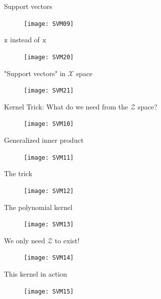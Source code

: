 \begin{frame}{Support vectors}
\begin{figure}
\texttt{[image: SVM09]}
\end{figure}
\end{frame}

\begin{frame}{${\rm z}$ instead of ${\rm x}$}
\begin{figure}
\texttt{[image: SVM20]}
\end{figure}
\end{frame}

\begin{frame}{"Support vectors" in $\mathcal{X}$ space}
\begin{figure}
\texttt{[image: SVM21]}
\end{figure}
\end{frame}

\begin{frame}{Kernel Trick: What do we need from the $\mathcal{Z}$ space?}
\begin{figure}
\texttt{[image: SVM10]}
\end{figure}
\end{frame}

\begin{frame}{Generalized inner product}
\begin{figure}
\texttt{[image: SVM11]}
\end{figure}
\end{frame}

\begin{frame}{The trick}
\begin{figure}
\texttt{[image: SVM12]}
\end{figure}
\end{frame}

\begin{frame}{The polynomial kernel}
\begin{figure}
\texttt{[image: SVM13]}
\end{figure}
\end{frame}

\begin{frame}{We only need $\mathcal{Z}$ to exist!}
\begin{figure}
\texttt{[image: SVM14]}
\end{figure}
\end{frame}

\begin{frame}{This kernel in action}
\begin{figure}
\texttt{[image: SVM15]}
\end{figure}
\end{frame}


